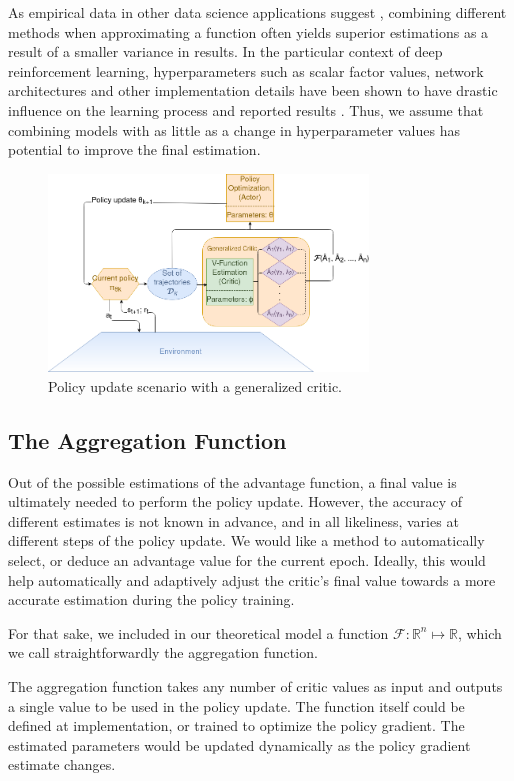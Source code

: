 As empirical data in other data science applications suggest \cite{xiao2018deep}, combining different methods when approximating a function often yields superior estimations as a result of a smaller variance in results. In the particular context of deep reinforcement learning, hyperparameters such as scalar factor values, network architectures and other implementation details have been shown to have drastic influence on the learning process and reported results \cite{islam2017reproducibility}. Thus, we assume that combining models with as little as a change in hyperparameter values has potential to improve the final estimation.

\begin{figure}[!htb]
\includegraphics[width=8.5cm]{images/model}
\caption{Policy update scenario with a generalized critic.}
\label{fig:model}
\end{figure}

\subsection{The Aggregation Function}

Out of the possible estimations of the advantage function, a final value is ultimately needed to perform the policy update. However, the accuracy of different estimates is not known in advance, and in all likeliness, varies at different steps of the policy update. We would like a method to automatically select, or deduce an advantage value for the current epoch. Ideally, this would help automatically and adaptively adjust the critic's final value towards a more accurate estimation during the policy training.

For that sake, we included in our theoretical model a function $\mathcal{F}: \mathbb{R}^n \mapsto \mathbb{R}$, which we call straightforwardly the aggregation function. 

The aggregation function takes any number of critic values as input and outputs a single value to be used in the policy update. The function itself could be defined at implementation,  or trained to optimize the policy gradient. The estimated parameters would be updated dynamically as the policy gradient estimate changes.
